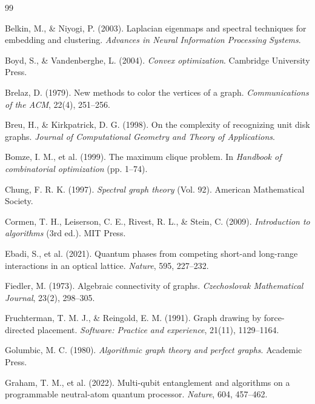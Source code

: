 \documentclass[11pt]{article}
\begin{document}
\begin{thebibliography}{99}

Belkin, M., \& Niyogi, P. (2003). Laplacian eigenmaps and spectral techniques for embedding and clustering. \textit{Advances in Neural Information Processing Systems}.

Boyd, S., \& Vandenberghe, L. (2004). \textit{Convex optimization}. Cambridge University Press.

Brelaz, D. (1979). New methods to color the vertices of a graph. \textit{Communications of the ACM}, 22(4), 251--256.

Breu, H., \& Kirkpatrick, D. G. (1998). On the complexity of recognizing unit disk graphs. \textit{Journal of Computational Geometry and Theory of Applications}.

Bomze, I. M., et al. (1999). The maximum clique problem. In \textit{Handbook of combinatorial optimization} (pp. 1--74).

Chung, F. R. K. (1997). \textit{Spectral graph theory} (Vol. 92). American Mathematical Society.

Cormen, T. H., Leiserson, C. E., Rivest, R. L., \& Stein, C. (2009). \textit{Introduction to algorithms} (3rd ed.). MIT Press.

Ebadi, S., et al. (2021). Quantum phases from competing short-and long-range interactions in an optical lattice. \textit{Nature}, 595, 227--232.

Fiedler, M. (1973). Algebraic connectivity of graphs. \textit{Czechoslovak Mathematical Journal}, 23(2), 298--305.

Fruchterman, T. M. J., \& Reingold, E. M. (1991). Graph drawing by force-directed placement. \textit{Software: Practice and experience}, 21(11), 1129--1164.

Golumbic, M. C. (1980). \textit{Algorithmic graph theory and perfect graphs}. Academic Press.

Graham, T. M., et al. (2022). Multi-qubit entanglement and algorithms on a programmable neutral-atom quantum processor. \textit{Nature}, 604, 457--462.


\end{thebibliography}
\end{document}
